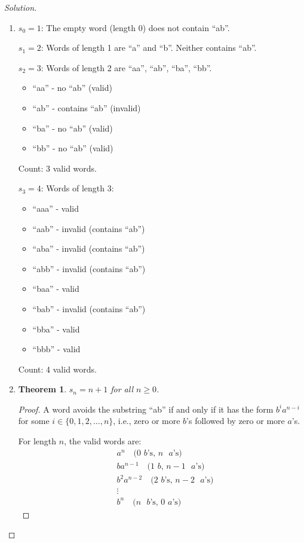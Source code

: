 \documentclass[12pt]{article}
\newtheorem*{theorem}{Theorem}
\begin{document}
\begin{proof}[Solution]
~
\begin{enumerate}[label=(\alph*)]
    \item 
    
    $s_0 = 1$: The empty word (length 0) does not contain ``ab''.
    
    $s_1 = 2$: Words of length 1 are ``a'' and ``b''. Neither contains ``ab''.
    
    $s_2 = 3$: Words of length 2 are ``aa'', ``ab'', ``ba'', ``bb''.
    \begin{itemize}
        \item ``aa'' - no ``ab'' (valid)
        \item ``ab'' - contains ``ab'' (invalid)
        \item ``ba'' - no ``ab'' (valid)
        \item ``bb'' - no ``ab'' (valid)
    \end{itemize}
    Count: 3 valid words.
    
    $s_3 = 4$: Words of length 3:
    \begin{itemize}
        \item ``aaa'' - valid
        \item ``aab'' - invalid (contains ``ab'')
        \item ``aba'' - invalid (contains ``ab'')
        \item ``abb'' - invalid (contains ``ab'')
        \item ``baa'' - valid
        \item ``bab'' - invalid (contains ``ab'')
        \item ``bba'' - valid
        \item ``bbb'' - valid
    \end{itemize}
    Count: 4 valid words.
    
    \item 
    
    \begin{theorem}
    $s_n = n + 1$ for all $n \geq 0$.
    \end{theorem}
    
    \begin{proof}
    A word avoids the substring ``ab'' if and only if it has the form $b^i a^{n-i}$ for some $i \in \{0, 1, 2, \ldots, n\}$, i.e., zero or more $b$'s followed by zero or more $a$'s.
    
    For length $n$, the valid words are:
    \begin{align*}
    &a^n \quad \text{(0 $b$'s, $n$ $a$'s)} \\
    &ba^{n-1} \quad \text{(1 $b$, $n-1$ $a$'s)} \\
    &b^2a^{n-2} \quad \text{(2 $b$'s, $n-2$ $a$'s)} \\
    &\vdots \\
    &b^n \quad \text{($n$ $b$'s, 0 $a$'s)}
    \end{align*}
    

\end{proof}
\end{enumerate}
\end{proof}
\end{document}
